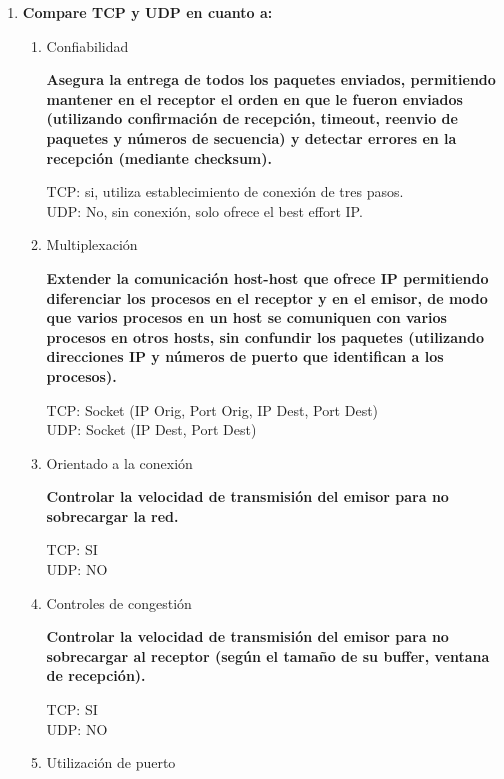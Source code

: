 \documentclass[a4paper,10pt]{article}
\begin{document}
\begin{enumerate}
    \item \textbf{Compare TCP y UDP en cuanto a:}
    
        \begin{enumerate}
            \item Confiabilidad
            
            \textbf{Asegura la entrega de todos los paquetes enviados, permitiendo mantener en el receptor el orden en que le fueron enviados (utilizando confirmación de recepción, timeout, reenvio de paquetes y números de secuencia) y detectar errores en la recepción (mediante checksum).}
            
            TCP: si, utiliza establecimiento de conexión de tres pasos. \\
            UDP: No, sin conexión, solo ofrece el best effort IP.
            
            \item Multiplexación
            
            \textbf{Extender la comunicación host-host que ofrece IP permitiendo diferenciar los procesos en el receptor y en el emisor, de modo que varios procesos en un host se comuniquen con varios procesos en otros hosts, sin confundir los paquetes (utilizando direcciones IP y números de puerto que identifican a los procesos).}
            
            TCP: Socket (IP Orig, Port Orig, IP Dest, Port Dest) \\
            UDP: Socket (IP Dest, Port Dest)
            
            \item Orientado a la conexión
            
            \textbf{Controlar la velocidad de transmisión del emisor para no sobrecargar la red.}
            
            TCP: SI \\
            UDP: NO
            
            \item Controles de congestión
            
            \textbf{Controlar la velocidad de transmisión del emisor para no sobrecargar al receptor (según el tamaño de su buffer, ventana de recepción).}
            
            TCP: SI \\
            UDP: NO
            
            \item Utilización de puerto
            

\end{enumerate}
\end{enumerate}
\end{document}
